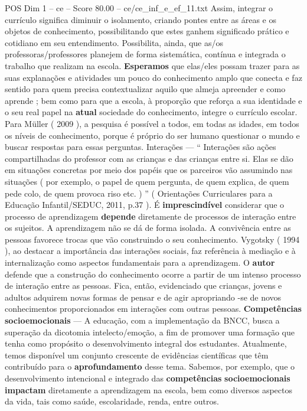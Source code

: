 \begin{textsample}{POS Dim 1 – ce – Score 80.00 – ce/ce\_inf\_e\_ef\_11.txt}
Assim, integrar o currículo significa diminuir o isolamento, criando pontes entre as áreas e os objetos de conhecimento, possibilitando que estes ganhem significado prático e cotidiano em seu entendimento.
Possibilita, ainda, que as/os professoras/professores planejem de forma sistemática, contínua e integrada o trabalho que realizam na escola. \textbf{Esperamos} que elas/eles possam trazer para as suas explanações e atividades um pouco do conhecimento amplo que conecta e faz sentido para quem precisa contextualizar aquilo que almeja apreender e como aprende ; bem como para que a escola, à proporção que reforça a sua identidade e o seu real papel na \textbf{atual} sociedade do conhecimento, integre o currículo escolar.
Para Müller ( 2009 ), a pesquisa é possível a todos, em todas as idades, em todos os níveis de conhecimento, porque é próprio do ser humano questionar o mundo e buscar respostas para essas perguntas.
Interações — “ Interações são ações compartilhadas do professor com as crianças e das crianças entre si.
Elas se dão em situações concretas por meio dos papéis que os parceiros vão assumindo nas situações ( por exemplo, o papel de quem pergunta, de quem explica, de quem pede colo, de quem provoca riso etc. ) ” ( Orientações Curriculares para a Educação Infantil/SEDUC, 2011, p.37 ).
É \textbf{imprescindível} considerar que o processo de aprendizagem \textbf{depende} diretamente de processos de interação entre os sujeitos.
A aprendizagem não se dá de forma isolada.
A convivência entre as pessoas favorece trocas que vão construindo o seu conhecimento.
Vygotsky ( 1994 ), ao destacar a importância das interações sociais, faz referência à mediação e à internalização como aspectos fundamentais para a aprendizagem.
O \textbf{autor} defende que a construção do conhecimento ocorre a partir de um intenso processo de interação entre as pessoas.
Fica, então, evidenciado que crianças, jovens e adultos adquirem novas formas de pensar e de agir apropriando -se de novos conhecimentos proporcionados em interações com outras pessoas. \textbf{Competências} \textbf{socioemocionais} — A educação, com a implementação da BNCC, busca a superação da dicotomia intelecto/emoção, a fim de promover uma formação que tenha como propósito o desenvolvimento integral dos estudantes.
Atualmente, temos disponível um conjunto crescente de evidências científicas que têm contribuído para o \textbf{aprofundamento} desse tema.
Sabemos, por exemplo, que o desenvolvimento intencional e integrado das \textbf{competências} \textbf{socioemocionais} \textbf{impactam} diretamente a aprendizagem na escola, bem como diversos aspectos da vida, tais como saúde, escolaridade, renda, entre outros.

\end{textsample}
